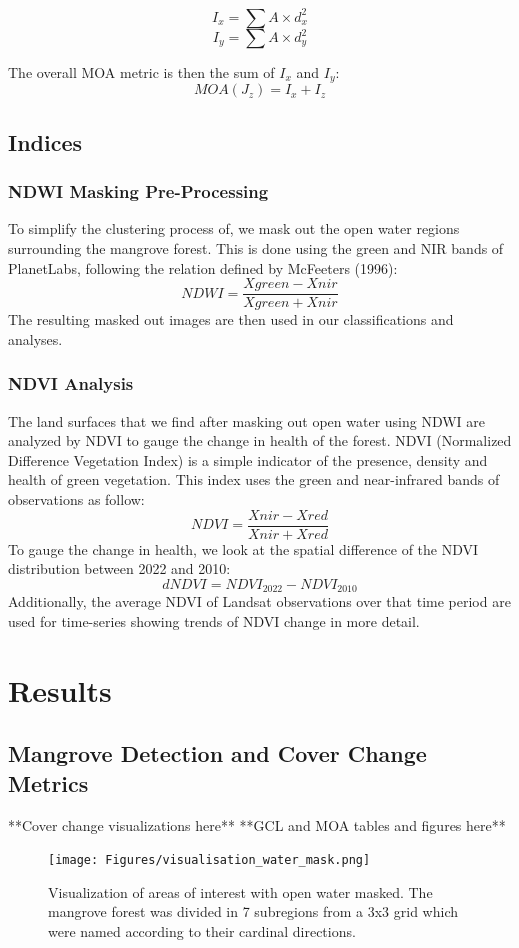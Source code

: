 \documentclass[journal,article,submit,pdftex,moreauthors]{Definitions/mdpi}
\begin{document}
\[I_x = \sum{A\times d_x^2} \] 
\[I_y = \sum{A\times d_y^2} \]

The overall MOA metric is then the sum of $I_{x}$ and $I_{y}$:
\[MOA (J_z) = I_x + I_z \]

\subsection{Indices}
\subsubsection{NDWI Masking Pre-Processing}
To simplify the clustering process of, we mask out the open water regions surrounding the mangrove forest. This is done using the green and NIR bands of PlanetLabs, following the relation defined by McFeeters (1996):
\[NDWI = \frac {Xgreen - Xnir}{Xgreen + Xnir} \]
The resulting masked out images are then used in our classifications and analyses.

\subsubsection{NDVI Analysis}
The land surfaces that we find after masking out open water using NDWI are analyzed by NDVI to gauge the change in health of the forest. NDVI (Normalized Difference Vegetation Index) is a simple indicator of the presence, density and health of green vegetation. This index uses the green and near-infrared bands of observations as follow:
\[NDVI = \frac{Xnir - Xred}{Xnir + Xred}\]
To gauge the change in health, we look at the spatial difference of the NDVI distribution between 2022 and 2010:
\[dNDVI = NDVI_{2022} - NDVI_{2010}\]
Additionally, the average NDVI of Landsat observations over that time period are used for time-series showing trends of NDVI change in more detail.
\section{Results}
\subsection{Mangrove Detection and Cover Change Metrics}
**Cover change visualizations here**
**GCL and MOA tables and figures here**

\begin{figure}[H]
\texttt{[image: Figures/visualisation\_water\_mask.png]}
\caption{Visualization of areas of interest with open water masked. The mangrove forest was divided in 7 subregions from a 3x3 grid which were named according to their cardinal directions.\label{fig1}}
\end{figure}  
\end{document}
